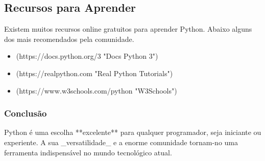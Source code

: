 \documentclass{article}
\begin{document}
\subsection{Recursos para Aprender}
Existem muitos recursos online gratuitos para aprender Python. Abaixo alguns
dos mais recomendados pela comunidade.


\begin{itemize}
  \item [Documentação Oficial](https://docs.python.org/3 "Docs Python 3")

  \item [Real Python](https://realpython.com "Real Python Tutorials")

  \item [W3Schools Python](https://www.w3schools.com/python "W3Schools")

\end{itemize}
\subsubsection{Conclusão}
Python é uma escolha **excelente** para qualquer programador, seja iniciante
ou experiente. A sua _versatilidade_ e a enorme comunidade tornam-no uma
ferramenta indispensável no mundo tecnológico atual.
\end{document}
